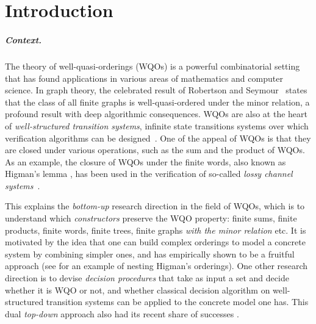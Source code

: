 \section{Introduction}
\label{sec:introduction}

\subparagraph{Context.} The theory of well-quasi-orderings (WQOs) is a powerful
combinatorial setting that has found applications in various areas of
mathematics and computer science. In graph theory, the celebrated result of
Robertson and Seymour~\cite{ROBSEY04} states that the class of all finite
graphs is well-quasi-ordered under the minor relation, a profound result with
deep algorithmic consequences. WQOs are also at the heart of
\emph{well-structured transition systems}, infinite state transitions systems
over which verification algorithms can be designed~\cite{ABDU96,ABDU98}. One of
the appeal of WQOs is that they are closed under various operations, such as
the sum and the product of WQOs. As an example, the closure of WQOs under the
finite words, also known as Higman's lemma \cite{HIG52}, has been used in the
verification of so-called \emph{lossy channel systems}~\cite{ABDU93}. 

This explains the \emph{bottom-up} research direction in the field of WQOs,
which is to understand which \emph{constructors} preserve the WQO property:
finite sums, finite products, finite words, finite trees, finite graphs
\emph{with the minor relation} etc. It is motivated by the idea that one can
build complex orderings to model a concrete system by combining simpler ones,
and has empirically shown to be a fruitful approach (see \cite{HSS13} for an
example of nesting Higman's orderings). One other research direction is to
devise \emph{decision procedures} that take as input a set and decide whether
it is WQO or not, and whether classical decision algorithm on well-structured
transition systems can be applied to the concrete model one has. This dual
\emph{top-down} approach also had its recent share of successes
\cite{FINGU19,LOPEZ24}.



